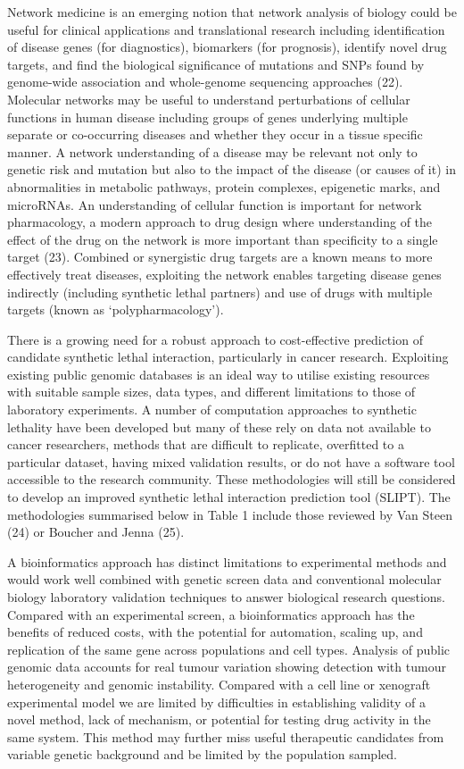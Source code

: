 Network medicine is an emerging notion that network analysis of biology could be useful for clinical applications and translational research including identification of disease genes (for diagnostics), biomarkers (for prognosis), identify novel drug targets, and find the biological significance of mutations and SNPs found by genome-wide association and whole-genome sequencing approaches (22). Molecular networks may be useful to understand perturbations of cellular functions in human disease including groups of genes underlying multiple separate or co-occurring diseases and whether they occur in a tissue specific manner. A network understanding of a disease may be relevant not only to genetic risk and mutation but also to the impact of the disease (or causes of it) in abnormalities in metabolic pathways, protein complexes, epigenetic marks, and microRNAs. An understanding of cellular function is important for network pharmacology, a modern approach to drug design where understanding of the effect of the drug on the network is more important than specificity to a single target (23). Combined or synergistic drug targets are a known means to more effectively treat diseases, exploiting the network enables targeting disease genes indirectly (including synthetic lethal partners) and use of drugs with multiple targets (known as ‘polypharmacology’). 

There is a growing need for a robust approach to cost-effective prediction of candidate synthetic lethal interaction, particularly in cancer research. Exploiting existing public genomic databases is an ideal way to utilise existing resources with suitable sample sizes, data types, and different limitations to those of laboratory experiments. A number of computation approaches to synthetic lethality have been developed but many of these rely on data not available to cancer researchers, methods that are difficult to replicate, overfitted to a particular dataset, having mixed validation results, or do not have a software tool accessible to the research community. These methodologies will still be considered to develop an improved synthetic lethal interaction prediction tool (SLIPT). The methodologies summarised below in Table 1 include those reviewed by Van Steen (24) or Boucher and Jenna (25). 

A bioinformatics approach has distinct limitations to experimental methods and would work well combined with genetic screen data and conventional molecular biology laboratory validation techniques to answer biological research questions. Compared with an experimental screen, a bioinformatics approach has the benefits of reduced costs, with the potential for automation, scaling up, and replication of the same gene across populations and cell types. Analysis of public genomic data accounts for real tumour variation showing detection with tumour heterogeneity and genomic instability. Compared with a cell line or xenograft experimental model we are limited by difficulties in establishing validity of a novel method, lack of mechanism, or potential for testing drug activity in the same system. This method may further miss useful therapeutic candidates from variable genetic background and be limited by the population sampled.

